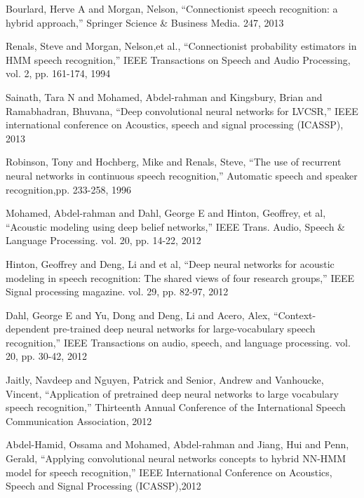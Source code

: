 \documentclass[conference]{IEEEtran}
\begin{document}
\begin{thebibliography}{00}

Bourlard, Herve A and Morgan, Nelson, "`Connectionist speech recognition: a hybrid approach,"' Springer Science \& Business Media. 247, 2013
  
Renals, Steve and Morgan, Nelson,et al., "`Connectionist probability estimators in HMM speech recognition,"' IEEE Transactions on Speech and Audio Processing, vol. 2, pp. 161-174, 1994

Sainath, Tara N and Mohamed, Abdel-rahman and Kingsbury, Brian and Ramabhadran, Bhuvana, "`Deep convolutional neural networks for LVCSR,"' IEEE international conference on Acoustics, speech and signal processing (ICASSP), 2013

Robinson, Tony and Hochberg, Mike and Renals, Steve, "`The use of recurrent neural networks in continuous speech recognition,"'  Automatic speech and speaker recognition,pp. 233-258, 1996

Mohamed, Abdel-rahman and Dahl, George E and Hinton, Geoffrey, et al, "`Acoustic modeling using deep belief networks,"' IEEE Trans. Audio, Speech \& Language Processing. vol. 20, pp. 14-22, 2012

Hinton, Geoffrey and Deng, Li and et al, "`Deep neural networks for acoustic modeling in speech recognition: The shared views of four research groups,"' IEEE Signal processing magazine. vol. 29, pp. 82-97,  2012

Dahl, George E and Yu, Dong and Deng, Li and Acero, Alex, "`Context-dependent pre-trained deep neural networks for large-vocabulary speech recognition,"' IEEE Transactions on audio, speech, and language processing. vol. 20, pp. 30-42, 2012

Jaitly, Navdeep and Nguyen, Patrick and Senior, Andrew and Vanhoucke, Vincent, "`Application of pretrained deep neural networks to large vocabulary speech recognition,"' Thirteenth Annual Conference of the International Speech Communication Association, 2012

Abdel-Hamid, Ossama and Mohamed, Abdel-rahman and Jiang, Hui and Penn, Gerald, "`Applying convolutional neural networks concepts to hybrid NN-HMM model for speech recognition,"' IEEE International Conference on Acoustics, Speech and Signal Processing (ICASSP),2012


\end{thebibliography}
\end{document}
